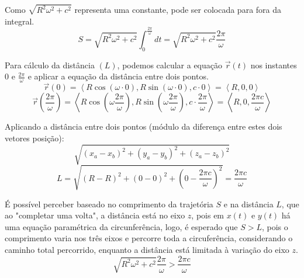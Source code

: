 Como $\sqrt{R^{2} \omega^{2} + c^{2}}$ representa uma constante, pode ser colocada para fora da integral.
\begin{equation} S = \sqrt{R^{2} \omega^{2} + c^{2}} \int_{0}^{\frac{2 \pi}{\omega}} dt = \sqrt{R^{2} \omega^{2} + c^{2}} \frac{2 \pi}{\omega} \end{equation}

Para cálculo da distância $(L)$, podemos calcular a equação $\vec{r}(t)$ nos instantes $0$ e $\frac{2 \pi}{\omega}$ e aplicar a equação da distância entre dois pontos.\begin{equation} \vec{r}(0) = \left\langle R\cos\left(\omega \cdot 0\right), R\sin\left(\omega \cdot 0\right), c \cdot 0 \right\rangle = \left\langle R, 0, 0 \right\rangle \end{equation}
\begin{equation} \vec{r}\left(\frac{2 \pi}{\omega}\right) = \left\langle R\cos\left(\omega \frac{2 \pi}{\omega}\right), R\sin\left(\omega \frac{2 \pi}{\omega}\right), c \cdot \frac{2 \pi}{\omega} \right\rangle = \left\langle R, 0, \frac{2 \pi c}{\omega} \right\rangle \end{equation}

Aplicando a distância entre dois pontos (módulo da diferença entre estes dois vetores posição):
\begin{equation} \sqrt{ \left(x_a - x_b \right)^{2} + \left(y_a - y_b \right)^{2} + \left(z_a - z_b \right)^{2}} \end{equation}
\begin{equation} L = \sqrt{\left( R - R \right)^{2} + \left( 0 - 0 \right)^{2} + \left( 0 - \frac{2 \pi c}{\omega} \right)^{2}} = \frac{2 \pi c}{\omega} \end{equation}

É possível perceber baseado no comprimento da trajetória $S$ e na distância $L$, que ao "completar uma volta", a distância está no eixo $z$, pois em $x(t)$ e $y(t)$ há uma equação paramétrica da circunferência, logo, é esperado que $S > L$, pois o comprimento varia nos três eixos e percorre toda a circuferência, considerando o caminho total percorrido, enquanto a distância está limitada à variação do eixo $z$.
\begin{equation} \sqrt{R^{2} \omega^{2} + c^{2}} \frac{2 \pi}{\omega} > \frac{2 \pi c}{\omega} \end{equation}

